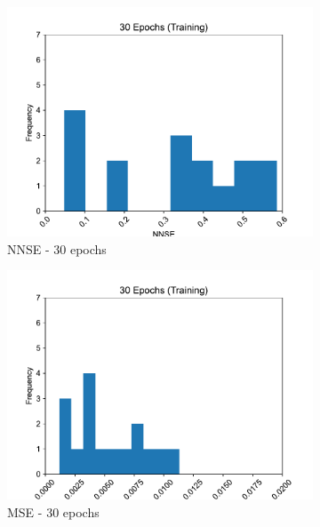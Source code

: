 \documentclass[11pt,twocolumn]{article}
\begin{document}
\begin{figure}[p]
     \begin{subfigure}[b]{0.49\textwidth}
        \centering\includegraphics[width=1.0\linewidth]{images/30_training-NNSE.pdf}
        \caption{NNSE - 30 epochs}
        \label{fig:tbd3}
     \end{subfigure}
     \hfill
     \begin{subfigure}[b]{0.49\textwidth}
        \centering\includegraphics[width=1.0\linewidth]{images/30_training-MSE.pdf}
        \caption{MSE - 30 epochs}
        \label{fig:tbd4}
     \end{subfigure}
     \hfill
          \newline
     \hfill
     \begin{subfigure}[b]{0.49\textwidth}

\end{subfigure}
\end{figure}
\end{document}
